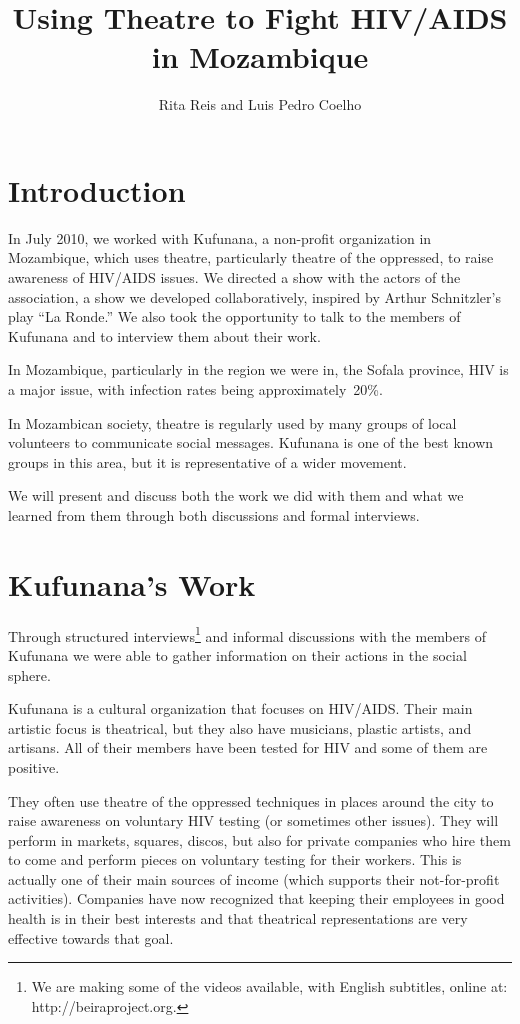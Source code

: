\documentclass[article,twocolumn]{memoir}
\title{Using Theatre to Fight HIV/AIDS in Mozambique}
\author{Rita Reis and Luis Pedro Coelho}
\date{}
\begin{document}
\maketitle

\chapter{Introduction}

In July 2010, we worked with Kufunana, a non-profit organization in Mozambique,
which uses theatre, particularly theatre of the oppressed, to raise awareness
of HIV/AIDS issues. We directed a show with the actors of the association, a
show we developed collaboratively, inspired by Arthur Schnitzler's play ``La
Ronde.'' We also took the opportunity to talk to the members of Kufunana and to
interview them about their work.

In Mozambique, particularly in the region we were in, the Sofala province, HIV
is a major issue, with infection rates being approximately~20\%.

In Mozambican society, theatre is regularly used by many groups of local
volunteers to communicate social messages. Kufunana is one of the best known
groups in this area, but it is representative of a wider movement.

We will present and discuss both the work we did with them and what we learned
from them through both discussions and formal interviews.

\chapter{Kufunana's Work}

Through structured interviews\footnote{We are making some of the videos
available, with English subtitles, online at: http://beiraproject.org.} and
informal discussions with the members of Kufunana we were able to gather
information on their actions in the social sphere.

Kufunana is a cultural organization that focuses on HIV/AIDS. Their main
artistic focus is theatrical, but they also have musicians, plastic artists,
and artisans. All of their members have been tested for HIV and some of them are
positive.

They often use theatre of the oppressed techniques in places around the city to
raise awareness on voluntary HIV testing (or sometimes other issues). They will
perform in markets, squares, discos, but also for private companies who hire
them to come and perform pieces on voluntary testing for their workers. This is
actually one of their main sources of income (which supports their
not-for-profit activities). Companies have now recognized that keeping their
employees in good health is in their best interests and that theatrical
representations are very effective towards that goal.
\end{document}

